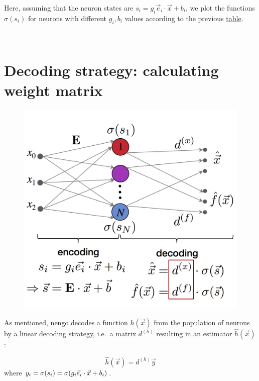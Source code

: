 \documentclass{report}
\makeatletter
\def\maxwidth{\ifdim\Gin@nat@width>\linewidth\linewidth
    \else\Gin@nat@width\fi}
\let\Oldincludegraphics\includegraphics
\renewcommand{\includegraphics}[1]{\Oldincludegraphics[width=.8\maxwidth]{#1}}
\makeatother
\begin{document}
Here, assuming that the neuron states are
\(s_i = g_i \vec e_i \cdot \vec x + b_i\), we plot the functions
\(\sigma(s_i)\) for neurons with different \(g_i, b_i\) values according
to the previous \protect\hyperlink{Encoding-strategy}{table}.

    \begin{center}
    \end{center}
    { \hspace*{\fill} \\}

\section{Decoding strategy: calculating weight
matrix}\label{decoding-strategy-calculating-weight-matrix}

\begin{figure}
\centering
\includegraphics{Fig1.png}
\caption{}
\end{figure}

As mentioned, nengo decodes a function \(h(\vec x)\) from the population
of neurons by a linear decoding strategy, i.e.~a matrix \(d^{(h)}\)
resulting in an estimator \(\hat h(\vec x)\):

\[\hat h(\vec x) = d^{(h)} \vec y\] where
\(y_i = \sigma(s_i) = \sigma(g_i \vec e_i \cdot \vec x + b_i)\\\).
\end{document}
